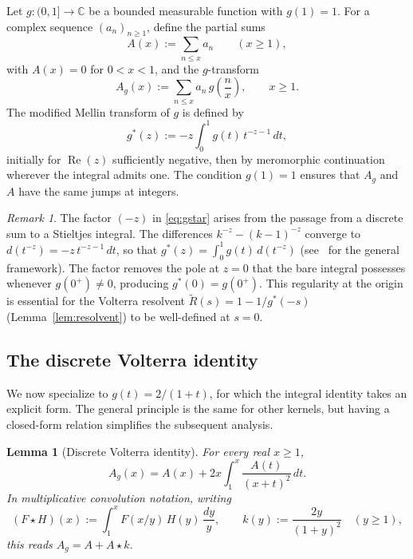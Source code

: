 \documentclass[11pt]{amsart}
\newtheorem{lemma}[theorem]{Lemma}
\theoremstyle{definition}
\theoremstyle{remark}
\newtheorem{remark}[theorem]{Remark}
\newcommand{\Real}{\operatorname{Re}}
\begin{document}
Let $g : (0,1] \to \mathbb{C}$ be a bounded measurable function with $g(1) = 1$. For a complex sequence $(a_n)_{n \geq 1}$, define the partial sums
$$
A(x) := \sum_{n \leq x} a_n \qquad (x \geq 1),
$$
with $A(x) = 0$ for $0 < x < 1$, and the $g$-transform
$$
A_g(x) := \sum_{n \leq x} a_n \, g\!\left(\frac{n}{x}\right), \qquad x \geq 1.
$$
The modified Mellin transform of $g$ is defined by
\begin{equation}\label{eq:gstar}
g^*(z) := -z \int_0^1 g(t)\, t^{-z-1}\, dt,
\end{equation}
initially for $\Real(z)$ sufficiently negative, then by meromorphic continuation wherever the integral admits one. The condition $g(1) = 1$ ensures that $A_g$ and $A$ have the same jumps at integers.

\begin{remark}\label{rem:factor}
The factor $(-z)$ in \eqref{eq:gstar} arises from the passage from a discrete sum to a Stieltjes integral. The differences $k^{-z} - (k-1)^{-z}$ converge to $d(t^{-z}) = -z\, t^{-z-1}\, dt$, so that $g^*(z) = \int_0^1 g(t)\, d(t^{-z})$ (see~\cite{Cloitre_RAF} for the general framework). The factor removes the pole at $z=0$ that the bare integral possesses whenever $g(0^+) \neq 0$, producing $g^*(0) = g(0^+)$. This regularity at the origin is essential for the Volterra resolvent $\widetilde{R}(s) = 1 - 1/g^*(-s)$ (Lemma~\ref{lem:resolvent}) to be well-defined at $s=0$.
\end{remark}


\subsection{The discrete Volterra identity}

We now specialize to $g(t) = 2/(1+t)$, for which the integral identity takes an explicit form. The general principle is the same for other kernels, but having a closed-form relation simplifies the subsequent analysis.

\begin{lemma}[Discrete Volterra identity]\label{lem:volterra}
For every real $x \geq 1$,
\begin{equation}\label{eq:volterra}
A_g(x) = A(x) + 2x \int_1^x \frac{A(t)}{(x+t)^2}\, dt.
\end{equation}
In multiplicative convolution notation, writing
$$
(F \star H)(x) := \int_1^x F(x/y)\, H(y)\, \frac{dy}{y}, \qquad k(y) := \frac{2y}{(1+y)^2} \quad (y \geq 1),
$$
this reads $A_g = A + A \star k$.
\end{lemma}
\end{document}
